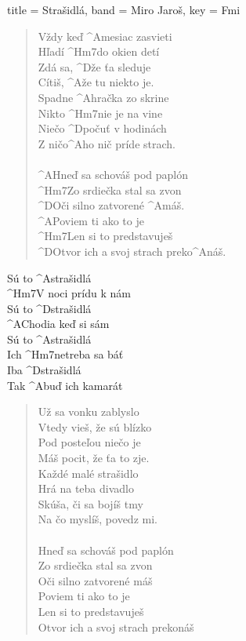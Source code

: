 \begin{song}[
    remember-chords = true ,
    verse/numbered = true ,
    transpose-capo = true 
  ]{
    title = Strašidlá,
    band = Miro Jaroš,
    key  = Fmi
  }

	\begin{verse}
	Vždy keď ^{A}mesiac zasvieti \\
	Hľadí ^{Hm7}do okien detí \\
	Zdá sa, ^{D}že ťa sleduje \\
	Cítiš, ^{A}že tu niekto je. \\
	Spadne ^{A}hračka zo skrine \\
	Nikto ^{Hm7}nie je na vine \\
	Niečo ^{D}počuť v hodinách \\
	Z ničo^{A}ho nič príde strach. \\
	\\
	^{A}Hneď sa schováš pod paplón \\
	^{Hm7}Zo srdiečka stal sa zvon \\
	^{D}Oči silno zatvorené ^{A}máš. \\
	^{A}Poviem ti ako to je \\
	^{Hm7}Len si to predstavuješ \\
	^{D}Otvor ich a svoj strach preko^{A}náš.
	\end{verse}
	
	\begin{chorus}
	Sú to ^{A}strašidlá \\
	^{Hm7}V noci prídu k nám \\
	Sú to ^{D}strašidlá \\
	^{A}Chodia keď si sám \\
	Sú to ^{A}strašidlá \\
	Ich ^{Hm7}netreba sa báť \\
	Iba ^{D}strašidlá \\
	Tak ^{A}buď ich kamarát
	\end{chorus}
	
	\begin{verse}
	Už sa vonku zablyslo \\
	Vtedy vieš, že sú blízko \\
	Pod posteľou niečo je \\
	Máš pocit, že ťa to zje. \\
	Každé malé strašidlo \\
	Hrá na teba divadlo \\
	Skúša, či sa bojíš tmy \\
	Na čo myslíš, povedz mi. \\
	\\
	Hneď sa schováš pod paplón \\
	Zo srdiečka stal sa zvon \\
	Oči silno zatvorené máš \\
	Poviem ti ako to je \\
	Len si to predstavuješ \\
	Otvor ich a svoj strach prekonáš
	\end{verse}
	

\end{song}
